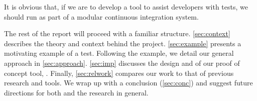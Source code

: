 It is obvious that, if we are to develop a tool to assist developers with \flaky
tests, we should run as part of a modular continuous integration system.

The rest of the report will proceed with a familiar structure.
\autoref{sec:context} describes the theory and context behind the project.
\autoref{sec:example} presents a motivating example of a \flaky test. Following
the example, we detail our general approach in \autoref{sec:approach}.
\autoref{sec:imp} discusses the design and of our proof of concept tool,
\venera. Finally, \autoref{sec:relwork} compares our work to that of previous
research and tools. We wrap up with a conclusion (\autoref{sec:conc}) and
suggest future directions for both \venera and the research in general.
